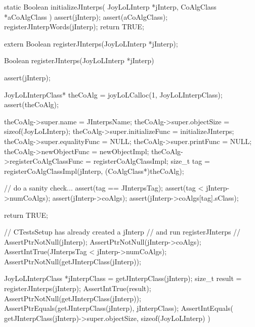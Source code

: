 \startCCode
static Boolean initializeJInterps(
  JoyLoLInterp *jInterp,
  CoAlgClass   *aCoAlgClass
) {
  assert(jInterp);
  assert(aCoAlgClass);
  registerJInterpWords(jInterp);
  return TRUE;
}
\stopCCode

\startTestSuite[regiserJInterps]

\startCHeader
extern Boolean registerJInterps(JoyLoLInterp *jInterp);
\stopCHeader
{}

\startCCode
Boolean registerJInterps(JoyLoLInterp *jInterp) {
  assert(jInterp);
  
  JoyLoLInterpClass* theCoAlg =
    joyLoLCalloc(1, JoyLoLInterpClass);
  assert(theCoAlg);
  
  theCoAlg->super.name             = JInterpsName;
  theCoAlg->super.objectSize       = sizeof(JoyLoLInterp);
  theCoAlg->super.initializeFunc   = initializeJInterps;
  theCoAlg->super.equalityFunc     = NULL;
  theCoAlg->super.printFunc        = NULL;
  theCoAlg->newObjectFunc          = newObjectImpl;
  theCoAlg->registerCoAlgClassFunc = registerCoAlgClassImpl;
  size_t tag =
    registerCoAlgClassImpl(jInterp, (CoAlgClass*)theCoAlg);
  
  // do a sanity check...
  assert(tag == JInterpsTag);
  assert(tag < jInterp->numCoAlgs);
  assert(jInterp->coAlgs);
  assert(jInterp->coAlgs[tag].sClass);
    
  return TRUE;
}
\stopCCode


\startCTest
  // CTestsSetup has already created a jInterp 
  // and run registerJInterps
  //
  AssertPtrNotNull(jInterp);
  AssertPtrNotNull(jInterp->coAlgs);
  AssertIntTrue(JInterpsTag < jInterp->numCoAlgs);
  AssertPtrNotNull(getJInterpClass(jInterp));
  
  JoyLoLInterpClass *jInterpClass = getJInterpClass(jInterp);
  size_t result = registerJInterps(jInterp);
  AssertIntTrue(result);
  AssertPtrNotNull(getJInterpClass(jInterp));
  AssertPtrEquals(getJInterpClass(jInterp), jInterpClass);
  AssertIntEquals(
    getJInterpClass(jInterp)->super.objectSize,
    sizeof(JoyLoLInterp)
  )
\stopCTest
\stopTestCase
\stopTestSuite

